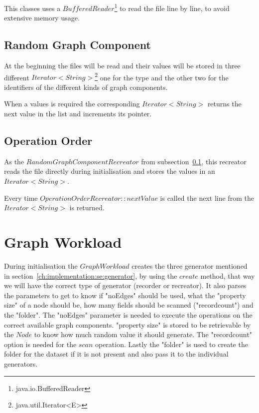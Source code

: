This classes uses a $ BufferedReader $\footnote{java.io.BufferedReader} to read the file line by line,
to avoid extensive memory usage.

\subsection{Random Graph Component}
\label{ch:implementation:se:randomGraphComponentRecreator}
At the beginning the files will be read and their values will be stored in three different $ Iterator<String> $\footnote{java.util.Iterator<E>} one for the type and the other two for the identifiers of the different kinds of graph components.

When a values is required the corresponding $ Iterator<String> $ returns the next value in the list and increments its pointer.

\subsection{Operation Order}
As the $ RandomGraphComponentRecreator $ from subsection~\ref{ch:implementation:se:randomGraphComponentRecreator},
this recreator reads the file directly during initialisation and stores the values in an $ Iterator<String> $.

Every time $ OperationOrderRecreator::nextValue $ is called the next line from the $ Iterator<String> $ is returned.

\section{Graph Workload}
\label{ch:implementation:se:graphWorkload}
During initialisation the $ GraphWorkload $ creates the three generator mentioned in section~\ref{ch:implementation:se:generator},
by using the $ create $ method,
that way we will have the correct type of generator (recorder or recreator).
It also parses the parameters to get to know if "noEdges" should be used,
what the "property size" of a node should be,
how many fields should be scanned ("recordcount") and the "folder".
The "noEdges" parameter is needed to execute the operations on the correct available graph components.
"property size" is stored to be retrievable by the $ Node $ to know how much random value it should generate.
The "recordcount" option is needed for the $ scan $ operation.
Lastly the "folder" is used to create the folder for the dataset if it is not present and also pass it to the individual generators.

